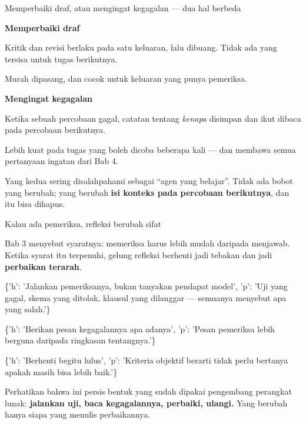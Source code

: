 \documentclass[aspectratio=169,11pt,t]{beamer}
\begin{document}
\begin{frame}[shrink=25]{Memperbaiki draf, atau mengingat kegagalan --- dua hal berbeda}
\begin{minipage}[t]{0.485\textwidth}
{\fontsize{9.4}{12.6}\selectfont\color{fg2}\textbf{Memperbaiki draf}\par}\vskip 4pt
{\fontsize{9.4}{12.6}\selectfont\color{fg2}Kritik dan revisi berlaku pada satu keluaran, lalu dibuang. Tidak ada yang tersisa untuk tugas berikutnya.\par}\vskip 4pt
{\fontsize{9.4}{12.6}\selectfont\color{fg2}Murah dipasang, dan cocok untuk keluaran yang punya pemeriksa.\par}\vskip 4pt

\end{minipage}%
\hfill
\begin{minipage}[t]{0.485\textwidth}
{\fontsize{9.4}{12.6}\selectfont\color{fg2}\textbf{Mengingat kegagalan}\par}\vskip 4pt
{\fontsize{9.4}{12.6}\selectfont\color{fg2}Ketika sebuah percobaan gagal, catatan tentang \textit{kenapa} disimpan dan ikut dibaca pada percobaan berikutnya.\par}\vskip 4pt
{\fontsize{9.4}{12.6}\selectfont\color{fg2}Lebih kuat pada tugas yang boleh dicoba beberapa kali --- dan membawa semua pertanyaan ingatan dari Bab 4.\par}\vskip 4pt

\end{minipage}%
\begin{iband}[signal]
Yang kedua sering disalahpahami sebagai ``agen yang belajar''. Tidak ada bobot yang berubah; yang berubah \textbf{isi konteks pada percobaan berikutnya}, dan itu bisa dihapus.
\end{iband}
\end{frame}

\begin{frame}[shrink=25]{Kalau ada pemeriksa, refleksi berubah sifat}
{\fontsize{9.4}{12.6}\selectfont\color{fg2}Bab 3 menyebut syaratnya: memeriksa harus lebih mudah daripada menjawab. Ketika syarat itu terpenuhi, gelung refleksi berhenti jadi tebakan dan jadi \textbf{perbaikan terarah}.\par}\vskip 4pt
\begin{isteps}
\item \{'h': 'Jalankan pemeriksanya, bukan tanyakan pendapat model', 'p': 'Uji yang gagal, skema yang ditolak, klausul yang dilanggar --- semuanya menyebut apa yang salah.'\}
\item \{'h': 'Berikan pesan kegagalannya apa adanya', 'p': 'Pesan pemeriksa lebih berguna daripada ringkasan tentangnya.'\}
\item \{'h': 'Berhenti begitu lulus', 'p': 'Kriteria objektif berarti tidak perlu bertanya apakah masih bisa lebih baik.'\}
\end{isteps}
\begin{iband}[signal]
Perhatikan bahwa ini persis bentuk yang sudah dipakai pengembang perangkat lunak: \textbf{jalankan uji, baca kegagalannya, perbaiki, ulangi.} Yang berubah hanya siapa yang menulis perbaikannya.
\end{iband}
\end{frame}
\end{document}
